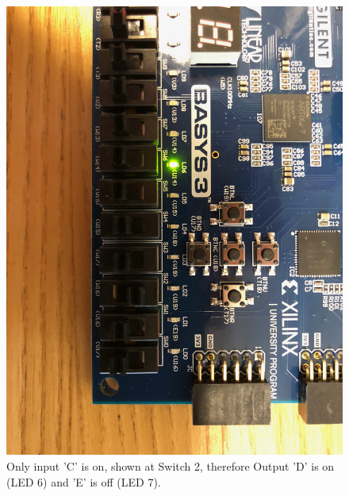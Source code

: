 \documentclass[11pt]{article}
\begin{document}
\begin{figure}[H]
	\includegraphics[width=\textwidth]{report_images/Lab1BoardPictures/Lab1Part1/IMG_0407.jpg}
	\caption{\label{fig:figure-name}Only input 'C' is on, shown at Switch 2, therefore Output 'D' is on (LED 6) and 'E' is off (LED 7).}
\end{figure}
\end{document}
